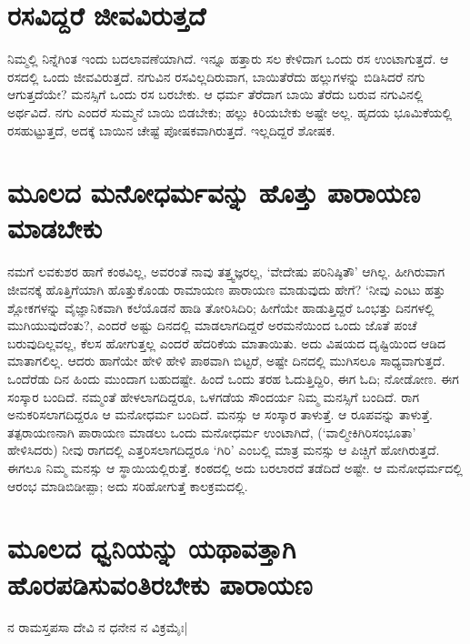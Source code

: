 \section*{ರಸವಿದ್ದರೆ ಜೀವವಿರುತ್ತದೆ} 

ನಿಮ್ಮಲ್ಲಿ ನಿನ್ನೆಗಿಂತ ಇಂದು ಬದಲಾವಣೆಯಾಗಿದೆ. ಇನ್ನೂ ಹತ್ತಾರು ಸಲ ಕೇಳಿದಾಗ ಒಂದು ರಸ ಉಂಟಾಗುತ್ತದೆ. ಆ ರಸದಲ್ಲಿ ಒಂದು ಜೀವವಿರುತ್ತದೆ. ನಗುವಿನ ರಸವಿಲ್ಲದಿರುವಾಗ, ಬಾಯಿತೆರೆದು ಹಲ್ಲುಗಳನ್ನು ಬಿಡಿಸಿದರೆ ನಗು ಆಗುತ್ತದೆಯೇ? ಮನಸ್ಸಿಗೆ ಒಂದು ರಸ ಬರಬೇಕು. ಆ ಧರ್ಮ ತೆರೆದಾಗ ಬಾಯಿ ತೆರೆದು ಬರುವ ನಗುವಿನಲ್ಲಿ ಅರ್ಥವಿದೆ. ನಗು ಎಂದರೆ ಸುಮ್ಮನೆ ಬಾಯಿ ಬಿಡಬೇಕು; ಹಲ್ಲು ಕಿರಿಯಬೇಕು ಅಷ್ಟೇ ಅಲ್ಲ. ಹೃದಯ ಭೂಮಿಕೆಯಲ್ಲಿ ರಸಹುಟ್ಟುತ್ತದೆ, ಅದಕ್ಕೆ ಬಾಯಿನ ಚೇಷ್ಟೆ ಪೋಷಕವಾಗಿರುತ್ತದೆ. ಇಲ್ಲದಿದ್ದರೆ ಶೋಷಕ. 

\section*{ಮೂಲದ ಮನೋಧರ್ಮವನ್ನು ಹೊತ್ತು ಪಾರಾಯಣ ಮಾಡಬೇಕು} 

ನಮಗೆ ಲವಕುಶರ ಹಾಗೆ ಕಂಠವಿಲ್ಲ, ಅವರಂತೆ ನಾವು ತತ್ತ್ವಜ್ಞರಲ್ಲ, `ವೇದೇಷು ಪರಿನಿಷ್ಠಿತೌ' ಆಗಿಲ್ಲ. ಹೀಗಿರುವಾಗ ಜೀವನಕ್ಕೆ ಹೊತ್ತಿಗೆಯಾಗಿ ಹೊತ್ತುಕೊಂಡು ರಾಮಾಯಣ ಪಾರಾಯಣ ಮಾಡುವುದು ಹೇಗೆ? `ನೀವು ಎಂಟು ಹತ್ತು ಶ್ಲೋಕಗಳನ್ನು ವೈಜ್ಞಾನಿಕವಾಗಿ ಕಲೆಯೊಡನೆ ಹಾಡಿ ತೋರಿಸಿದಿರಿ; ಹೀಗೆಯೇ ಹಾಡುತ್ತಿದ್ದರೆ ಒಂಭತ್ತು ದಿನಗಳಲ್ಲಿ ಮುಗಿಯುವುದೆಂತು?, ಎಂದರೆ ಅಷ್ಟು ದಿನದಲ್ಲಿ ಮಾಡಲಾಗದಿದ್ದರೆ ಅರಮನೆಯಿಂದ ಒಂದು ಜೊತೆ ಪಂಚೆ ಬರುವುದಿಲ್ಲವಲ್ಲ, ಕೆಲಸ ಹೋಗುತ್ತಲ್ಲ ಎಂದರೆ ಹೆದರಿಕೆಯ ಮಾತಾಯಿತು. ಅದು ವಿಷಯದ ದೃಷ್ಟಿಯಿಂದ ಆಡಿದ ಮಾತಾಗಲಿಲ್ಲ. ಆದರು ಹಾಗೆಯೇ ಹೇಳಿ ಹೇಳಿ ಪಾಠವಾಗಿ ಬಿಟ್ಟರೆ, ಅಷ್ಟೇ ದಿನದಲ್ಲಿ ಮುಗಿಸಲೂ ಸಾಧ್ಯವಾಗುತ್ತದೆ. ಒಂದೆರೆಡು ದಿನ ಹಿಂದು ಮುಂದಾಗ ಬಹುದಷ್ಟೇ. ಹಿಂದೆ ಒಂದು ತರಹ ಓದುತ್ತಿದ್ದಿರಿ, ಈಗ ಓದಿ; ನೋಡೋಣ. ಈಗ ಸಂಸ್ಕಾರ ಬಂದಿದೆ. ನಮ್ಮಂತೆ ಹೇಳಲಾಗದಿದ್ದರೂ, ಒಳಗಡೆಯ ಸೌಂದರ್ಯ ನಿಮ್ಮ ಮನಸ್ಸಿಗೆ ಬಂದಿದೆ. ರಾಗ ಅನುಕರಿಸಲಾಗದಿದ್ದರೂ ಆ ಮನೋಧರ್ಮ ಬಂದಿದೆ. ಮನಸ್ಸು ಆ ಸಂಸ್ಕಾರ ತಾಳುತ್ತೆ. ಆ ರೂಪವನ್ನು ತಾಳುತ್ತೆ. ತತ್ಪರಾಯಣನಾಗಿ ಪಾರಾಯಣ ಮಾಡಲು ಒಂದು ಮನೋಧರ್ಮ ಉಂಟಾಗಿದೆ, (`ವಾಲ್ಮೀಕಿಗಿರಿಸಂಭೂತಾ' ಹೇಳಿಸಿದರು) ನೀವು ರಾಗದಲ್ಲಿ ಎತ್ತರಿಸಲಾಗದಿದ್ದರೂ `ಗಿರಿ' ಎಂಬಲ್ಲಿ ಮಾತ್ರ ಮನಸ್ಸು ಆ ಪಿಚ್ಚಿಗೆ ಹೋಗಿರುತ್ತದೆ. ಈಗಲೂ ನಿಮ್ಮ ಮನಸ್ಸು ಆ ಸ್ಥಾಯಿಯಲ್ಲಿರುತ್ತೆ. ಕಂಠದಲ್ಲಿ ಅದು ಬರಲಾರದೆ ತಡೆದಿದೆ ಅಷ್ಟೇ. ಆ ಮನೋಧರ್ಮದಲ್ಲಿ ಆರಂಭ ಮಾಡಿಬಿಡೀಪ್ಪಾ; ಅದು ಸರಿಹೋಗುತ್ತೆ ಕಾಲಕ್ರಮದಲ್ಲಿ. 

\section*{ಮೂಲದ ಧ್ವನಿಯನ್ನು ಯಥಾವತ್ತಾಗಿ ಹೊರಪಡಿಸುವಂತಿರಬೇಕು ಪಾರಾಯಣ} 

\begin{shloka} 
ನ ರಾಮಸ್ತಪಸಾ ದೇವಿ ನ ಧನೇನ ನ ವಿಕ್ರಮೈಃ| \label{191}
\end{shloka}

